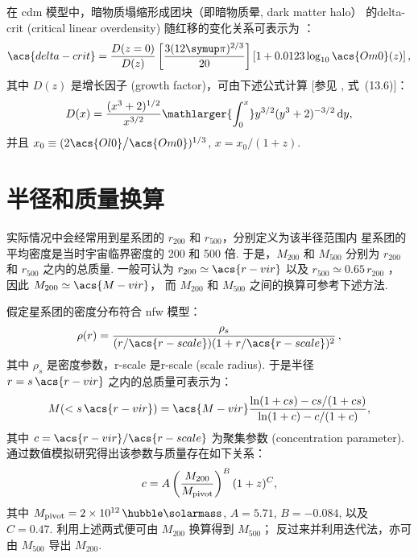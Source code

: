 在 \ac{cdm} 模型中，暗物质塌缩形成团块（即暗物质晕, dark matter halo）
的\acl{delta-crit} (critical linear overdensity)
随红移的变化关系可表示为 \cite{kitayama1996,randall2002}：
\begin{equation}
  \label{eq:delta-crit}
  \acs{delta-crit} = \frac{D(z=0)}{D(z)}
    \left[ \frac{3 (12\Cpi)^{2/3}}{20} \right]
    \left[1 + 0.0123 \log_{10} \acs{Om0}(z) \right] ,
\end{equation}
其中 $D(z)$ 是增长因子 (growth factor)，可由下述公式计算
[参见 , 式~(13.6)]：
\begin{equation}
  \label{eq:growth-factor}
  D(x) = \frac{(x^3 + 2)^{1/2}}{x^{3/2}}
    \mathlarger{\int_0^x} y^{3/2} (y^3 + 2)^{-3/2} \,\D{y} ,
\end{equation}
并且 $x_0 \equiv (2 \acs{Ol0} \big/ \acs{Om0})^{1/3}$,
$x = x_0 \big/ (1+z)$.


\section{半径和质量换算}

实际情况中会经常用到星系团的 $r_{200}$ 和 $r_{500}$，分别定义为该半径范围内
星系团的平均密度是当时宇宙临界密度的 200 和 500 倍.
于是，$M_{200}$ 和 $M_{500}$ 分别为 $r_{200}$ 和 $r_{500}$ 之内的总质量.
一般可认为 $r_{200} \simeq \acs{r-vir}$
以及 $r_{500} \simeq 0.65 \, r_{200}$ \cite{ettori2009}，
因此 $M_{200} \simeq \acs{M-vir}$，
而 $M_{200}$ 和 $M_{500}$ 之间的换算可参考下述方法.

假定星系团的密度分布符合 \ac{nfw} 模型\cite{navarro1997}：
\begin{equation}
  \label{eq:nfw}
  \rho(r) = \frac{\rho_s}{
    (r / \acs{r-scale}) (1 + r / \acs{r-scale})^2} \,,
\end{equation}
其中 $\rho_s$ 是密度参数，\acs{r-scale} 是\acl{r-scale} (scale radius).
于是半径 $r = s \,\acs{r-vir}$ 之内的总质量可表示为\cite{lokas2001}：
\begin{equation}
  \label{eq:mass-r}
  M(< s \,\acs{r-vir}) = \acs{M-vir}
    \frac{\ln(1 + c s) - c s / (1 + c s)}{\ln(1 + c) - c / (1 + c)} ,
\end{equation}
其中 $c = \acs{r-vir} / \acs{r-scale}$ 为聚集参数 (concentration parameter).
 通过数值模拟研究得出该参数与质量存在如下关系：
\begin{equation}
  \label{eq:mass-c}
  c = A \left( \frac{M_{200}}{M_{\mathrm{pivot}}} \right)^B (1+z)^C ,
\end{equation}
其中 $M_{\R{pivot}} = \SI{2e12}{\per\hubble\solarmass}$,
$A = 5.71$, $B = -0.084$, 以及 $C = 0.47$.
利用上述两式便可由 $M_{200}$ 换算得到 $M_{500}$；
反过来并利用迭代法，亦可由 $M_{500}$ 导出 $M_{200}$.


